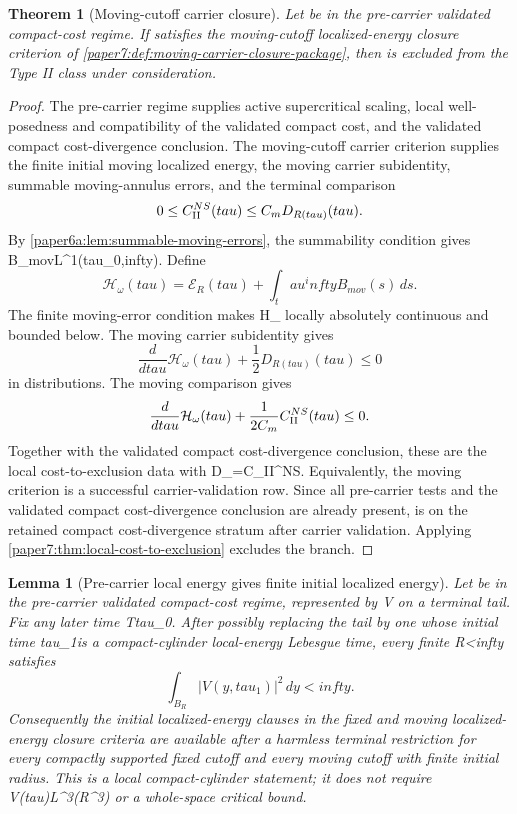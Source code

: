 \documentclass[11pt]{amsart}
\def\({}%
\def\){}%
\def\tilde#1{#1}%
\def\mathfrak#1{#1}%
\def\mathrm#1{#1}%
\def\mathbb#1{#1}%
\def\tau{tau}%
\def\infty{infty}%
\theoremstyle{plain}
\newtheorem{theorem}{Theorem}[section]
\newtheorem{lemma}[lemma]{Lemma}
\theoremstyle{definition}
\theoremstyle{remark}
\begin{document}
\begin{theorem}[Moving-cutoff carrier closure]
\label{paper7:thm:moving-carrier-closure}
Let \(\omega\) be in the pre-carrier validated compact-cost regime.  If
\(\omega\) satisfies the moving-cutoff localized-energy closure criterion of
\cref{paper7:def:moving-carrier-closure-package}, then \(\omega\) is excluded
from the Type II class under consideration.
\end{theorem}

\begin{proof}
The pre-carrier regime supplies active supercritical scaling, local
well-posedness and compatibility of the validated compact cost, and the
validated compact cost-divergence conclusion.  The moving-cutoff carrier
criterion supplies the finite initial moving localized energy, the
moving carrier subidentity, summable moving-annulus errors, and
the terminal comparison
\[
  0\le \mathfrak C_{\rm II}^{NS}(\tau)
  \le C_m\tilde{\mathfrak D}_{R(\tau)}(\tau).
\]
By \cref{paper6a:lem:summable-moving-errors}, the summability condition gives
\(B_{\mathrm{mov}}\in L^1(\tau_0,\infty)\).  Define
\[
  \mathcal H_\omega(\tau)
  =
  \mathcal E_R(\tau)+\int_\tau^\infty B_{\mathrm{mov}}(s)\,ds .
\]
The finite moving-error condition makes \(\mathcal H_\omega\) locally
absolutely continuous and bounded below.  The moving carrier subidentity gives
\[
  \frac{d}{d\tau}\mathcal H_\omega(\tau)
  +\frac12\tilde{\mathfrak D}_{R(\tau)}(\tau)\le0
\]
in distributions.  The moving comparison gives
\[
  \frac{d}{d\tau}\mathcal H_\omega(\tau)
  +\frac{1}{2C_m}\mathfrak C_{\rm II}^{NS}(\tau)\le0 .
\]
Together with the validated compact cost-divergence conclusion, these are the
local cost-to-exclusion data with
\(\mathcal D_\omega=\mathfrak C_{\rm II}^{NS}\).  Equivalently, the moving
criterion is a successful carrier-validation row.  Since all pre-carrier tests
and the validated compact cost-divergence conclusion are already present,
\(\omega\) is on the retained compact cost-divergence stratum after carrier
validation.  Applying \cref{paper7:thm:local-cost-to-exclusion} excludes the
branch.
\end{proof}

\begin{lemma}[Pre-carrier local energy gives finite initial localized energy]
\label{paper7:lem:precarrier-finite-local-energy}
Let \(\omega\) be in the pre-carrier validated compact-cost regime, represented
by \(V\) on a terminal tail.  Fix any later time \(T\ge\tau_0\).  After
possibly replacing the tail by one whose initial time
\(\tau_1\in[T,T+1]\) is a compact-cylinder local-energy Lebesgue time, every
finite \(R<\infty\) satisfies
\[
  \int_{B_R}|V(y,\tau_1)|^2\,dy<\infty .
\]
Consequently the initial localized-energy clauses in the fixed and moving
localized-energy closure criteria are available after a harmless terminal
restriction for every compactly supported fixed cutoff and every moving cutoff
with finite initial radius.  This is a local compact-cylinder statement; it does
not require \(V(\tau)\in L^3(\mathbb R^3)\) or a whole-space critical bound.
\end{lemma}
\end{document}
